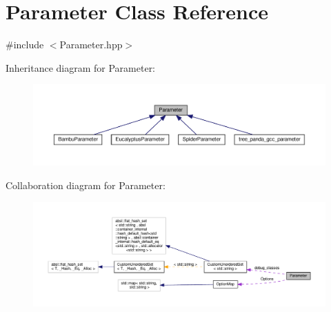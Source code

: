 \hypertarget{classParameter}{}\section{Parameter Class Reference}
\label{classParameter}


{\ttfamily \#include $<$Parameter.\+hpp$>$}



Inheritance diagram for Parameter\+:
\nopagebreak
\begin{figure}[H]
\begin{center}
\leavevmode
\includegraphics[width=350pt]{dd/d72/classParameter__inherit__graph}
\end{center}
\end{figure}


Collaboration diagram for Parameter\+:
\nopagebreak
\begin{figure}[H]
\begin{center}
\leavevmode
\includegraphics[width=350pt]{de/dcf/classParameter__coll__graph}
\end{center}
\end{figure}
